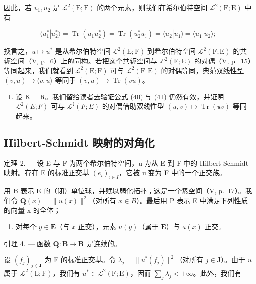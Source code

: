 因此，若 \(u_{1}, u_{2}\) 是 \(\mathcal{L}^2(\mathrm{E};\mathrm{F})\) 的两个元素，则我们在希尔伯特空间 \(\mathcal{L}^2(\mathrm{F};\mathrm{E})\) 中有

\[
\langle u _ {1} ^ {*} | u _ {2} ^ {*} \rangle = \operatorname{Tr} (u _ {1} u _ {2} ^ {*}) = \operatorname{Tr} (u _ {2} ^ {*} u _ {1}) = \langle u _ {2} | u _ {1} \rangle = \overline {{\langle u _ {1} | u _ {2} \rangle}};\tag{42}
\]

换言之，\(u \mapsto u^*\) 是从希尔伯特空间 \(\mathcal{L}^2(\mathrm{E};\mathrm{F})\) 到希尔伯特空间 \(\mathcal{L}^2(\mathrm{F};\mathrm{E})\) 的共轭空间（V, p.~6）上的同构。若把这个共轭空间与 \(\mathcal{L}^2 (\mathrm{F};\mathrm{E})\) 的对偶（V, p.~15）等同起来，我们就看到 \(\mathcal{L}^2 (\mathrm{E};\mathrm{F})\) 可与 \(\mathcal{L}^2 (\mathrm{F};\mathrm{E})\) 的对偶等同，典范双线性型 \((v,u)\mapsto \langle v,u\rangle\) 等同于 \((v,u)\mapsto \operatorname {Tr}(vu)\)。

\begin{enumerate}
\def\labelenumi{\arabic{enumi})}
\setcounter{enumi}{1}
\tightlist
\item
  设 K = R。我们留给读者去验证公式 (40) 与 (41) 仍然有效，并证明 \(\mathcal{L}^{2}(E; F)\) 可与 \(\mathcal{L}^{2}(F; E)\) 的对偶借助双线性型 \((u, v) \mapsto \operatorname{Tr}(uv)\) 等同起来。
\end{enumerate}

\subsection{Hilbert-Schmidt 映射的对角化}

定理 2. --- 设 E 与 F 为两个希尔伯特空间，u 为从 E 到 F 中的 Hilbert-Schmidt 映射。存在 E 的标准正交基 \((e_{i})_{i\in I}\)，它被 u 变为 F 中的一个正交族。

用 B 表示 E 的（闭）单位球，并赋以弱化拓扑；这是一个紧空间（V, p.~17）。我们令 \(\mathbf{Q}(x) = \|u(x)\|^{2}\)（对所有 \(x \in B\)）。最后用 P 表示 E 中满足下列性质的向量 x 的全体；

\begin{enumerate}
\def\labelenumi{(\Alph{enumi})}
\setcounter{enumi}{7}
\tightlist
\item
  对每个 \(y \in \mathbf{E}\)（与 \(x\) 正交），元素 \(u(y)\)（属于 \(\mathbf{E}\)）与 \(u(x)\) 正交。
\end{enumerate}

引理 4. --- 函数 \(\mathbf{Q}:\mathbf{B}\to \mathbf{R}\) 是连续的。

设 \((f_j)_{j\in \mathbf{J}}\) 为 F 的标准正交基。令 \(\lambda_{j} = \| u^{*}(f_{j})\|^{2}\)（对所有 \(j\in \mathbf{J}\)）。由于 \(u\) 属于 \(\mathcal{L}^2 (\mathrm{E};\mathrm{F})\)，我们有 \(u^{*}\in \mathcal{L}^{2}(\mathrm{F};\mathrm{E})\)，因而 \(\sum_{j}\lambda_{j} < + \infty\)。此外，我们有


